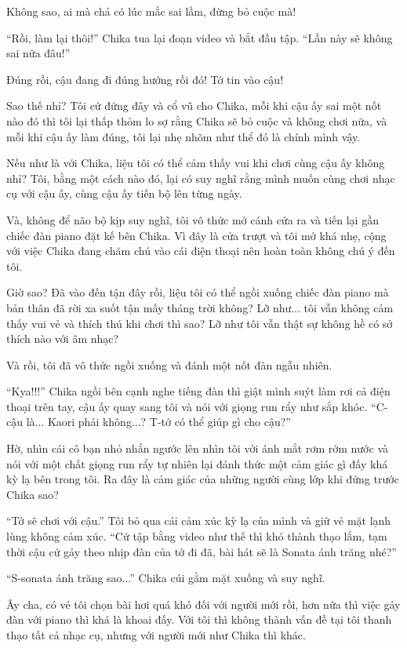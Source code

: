 {Không sao, ai mà chả có lúc mắc sai lầm, đừng bỏ cuộc mà!

``Rồi, làm lại thôi!'' Chika tua lại đoạn video và bắt đầu tập. ``Lần
này sẽ không sai nữa đâu!''

Đúng rồi, cậu đang đi đúng hướng rồi đó! Tớ tin vào cậu!

Sao thế nhỉ? Tôi cứ đứng đây và cổ vũ cho Chika, mỗi khi cậu ấy sai một
nốt nào đó thì tôi lại thấp thỏm lo sợ rằng Chika sẽ bỏ cuộc và không
chơi nữa, và mỗi khi cậu ấy làm đúng, tôi lại nhẹ nhõm như thể đó là
chính mình vậy.

Nếu như là với Chika, liệu tôi có thể cảm thấy vui khi chơi cùng cậu ấy
không nhỉ? Tôi, bằng một cách nào đó, lại có suy nghĩ rằng mình muốn
cùng chơi nhạc cụ với cậu ấy, cùng cậu ấy tiến bộ lên từng ngày.

Và, không để não bộ kịp suy nghĩ, tôi vô thức mở cánh cửa ra và tiến lại
gần chiếc đàn piano đặt kế bên Chika. Vì đây là cửa trượt và tôi mở khá
nhẹ, cộng với việc Chika đang chăm chú vào cái điện thoại nên hoàn toàn
không chú ý đến tôi.

Giờ sao? Đã vào đến tận đây rồi, liệu tôi có thể ngồi xuống chiếc đàn
piano mà bản thân đã rời xa suốt tận mấy tháng trời không? Lỡ như... tôi
vẫn không cảm thấy vui vẻ và thích thú khi chơi thì sao? Lỡ như tôi vẫn
thật sự không hề có sở thích nào với âm nhạc?

Và rồi, tôi đã vô thức ngồi xuống và đánh một nốt đàn ngẫu nhiên.

``Kya!!!'' Chika ngồi bên cạnh nghe tiếng đàn thì giật mình suýt làm rơi
cả điện thoại trên tay, cậu ấy quay sang tôi và nói với giọng run rẩy
như sắp khóc. ``C-cậu là... Kaori phải không...? T-tớ có thể giúp gì cho
cậu?''

Hờ, nhìn cái cô bạn nhỏ nhắn ngước lên nhìn tôi với ánh mắt rơm rớm nước
và nói với một chất giọng run rẩy tự nhiên lại đánh thức một cảm giác gì
đấy khá kỳ lạ bên trong tôi. Ra đây là cảm giác của những người cùng lớp
khi đứng trước Chika sao?

``Tớ sẽ chơi với cậu.'' Tôi bỏ qua cái cảm xúc kỳ lạ của mình và giữ vẻ
mặt lạnh lùng không cảm xúc. ``Cứ tập bằng video như thế thì khó thành
thạo lắm, tạm thời cậu cứ gảy theo nhịp đàn của tớ đi đã, bài hát sẽ là
Sonata ánh trăng nhé?''

``S-sonata ánh trăng sao...'' Chika cúi gằm mặt xuống và suy nghĩ.

Ây cha, có vẻ tôi chọn bài hơi quá khó đối với người mới rồi, hơn nữa
thì việc gảy đàn với piano thì khá là khoai đấy. Với tôi thì không thành
vấn đề tại tôi thanh thạo tất cả nhạc cụ, nhưng với người mới như Chika
thì khác.

}
